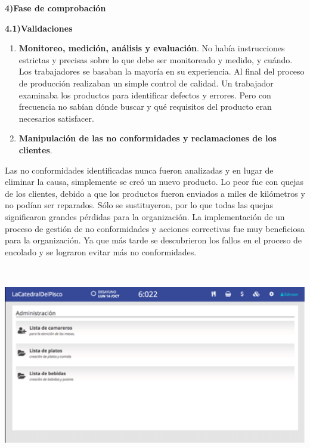 \documentclass{article} %
\begin{document}
\noindent 

\noindent \textbf{4)Fase de comprobaci\'{o}n}

\textbf{       4.1)Validaciones}

\begin{enumerate}
\item \textbf{ Monitoreo, medici\'{o}n, an\'{a}lisis y evaluaci\'{o}n}. No hab\'{i}a instrucciones estrictas y precisas sobre lo que debe ser monitoreado y medido, y cu\'{a}ndo. Los trabajadores se basaban la mayor\'{i}a en su experiencia. Al final del proceso de producci\'{o}n realizaban un simple control de calidad. Un trabajador examinaba los productos para identificar defectos y errores. Pero con frecuencia no sab\'{i}an d\'{o}nde buscar y qu\'{e} requisitos del producto eran necesarios satisfacer.

\item  \textbf{Manipulaci\'{o}n de las no conformidades y reclamaciones de los clientes}. 
\end{enumerate}

\noindent Las no conformidades identificadas nunca fueron analizadas y en lugar de eliminar la causa, simplemente se cre\'{o} un nuevo producto. Lo peor fue con quejas de los clientes, debido a que los productos fueron enviados a miles de kil\'{o}metros y no pod\'{i}an ser reparados. S\'{o}lo se sustituyeron, por lo que todas las quejas significaron grandes p\'{e}rdidas para la organizaci\'{o}n. La implementaci\'{o}n de un proceso de gesti\'{o}n de no conformidades y acciones correctivas fue muy beneficiosa para la organizaci\'{o}n. Ya que m\'{a}s tarde se descubrieron los fallos en el proceso de encolado y se lograron evitar m\'{a}s no conformidades.

\includegraphics*[width=6.66in, height=3.46in, keepaspectratio=false]{image8}

\noindent 

\noindent 

\noindent 

\noindent 

\noindent 

\noindent 

\noindent 

\noindent 

\noindent 
\end{document}
